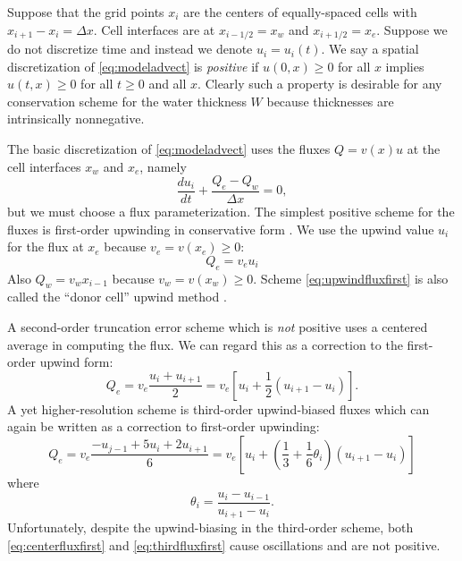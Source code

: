 \documentclass[11pt,final]{amsart}%
\begin{document}
Suppose that the grid points $x_i$ are the centers of equally-spaced cells with $x_{i+1}-x_i=\Delta x$.  Cell interfaces are at $x_{i-1/2}=x_w$ and $x_{i+1/2}=x_e$.  Suppose we do not discretize time and instead we denote $u_i=u_i(t)$.  We say a spatial discretization of \eqref{eq:modeladvect} is \emph{positive} if $u(0,x)\ge 0$ for all $x$ implies $u(t,x)\ge 0$ for all $t\ge 0$ and all $x$.  Clearly such a property is desirable for any conservation scheme for the water thickness $W$ because thicknesses are intrinsically nonnegative.

The basic discretization of \eqref{eq:modeladvect} uses the fluxes $Q=v(x) u$ at the cell interfaces $x_w$ and $x_e$, namely
\begin{equation}
\frac{du_i}{dt} + \frac{Q_e - Q_w}{\Delta x} = 0, \label{eq:basicmodelFD}
\end{equation}
but we must choose a flux parameterization.  The simplest positive scheme for the fluxes is first-order upwinding in conservative form \citep[section I.4.3]{HundsdorferVerwer2010}.  We use the upwind value $u_i$ for the flux at $x_e$ because $v_e = v(x_e) \ge 0$:
\begin{equation}
Q_e = v_e u_i \label{eq:upwindfluxfirst}
\end{equation}
Also $Q_w = v_w x_{i-1}$ because $v_w = v(x_w) \ge 0$.  Scheme \eqref{eq:upwindfluxfirst} is also called the ``donor cell'' upwind method \citep{LeVeque}.

A second-order truncation error scheme which is \emph{not} positive uses a centered average in computing the flux.  We can regard this as a correction to the first-order upwind form:
\begin{equation}
Q_e = v_e \frac{u_i+u_{i+1}}{2} = v_e \left[u_i + \frac{1}{2} (u_{i+1} - u_i)\right]. \label{eq:centerfluxfirst}
\end{equation}
A yet higher-resolution scheme is third-order upwind-biased fluxes which can again be written as a correction to first-order upwinding:
\begin{equation}
Q_e = v_e \frac{-u_{j-1} + 5 u_i + 2 u_{i+1}}{6} = v_e \left[u_i + \left(\frac{1}{3}+\frac{1}{6} \theta_i \right) (u_{i+1} - u_i)\right] \label{eq:thirdfluxfirst}
\end{equation}
where
\begin{equation}
\theta_i = \frac{u_{i} - u_{i-1}}{u_{i+1} - u_i}.  \label{eq:thetadefine}
\end{equation}
Unfortunately, despite the upwind-biasing in the third-order scheme, both \eqref{eq:centerfluxfirst} and \eqref{eq:thirdfluxfirst} cause oscillations and are not positive.
\end{document}
